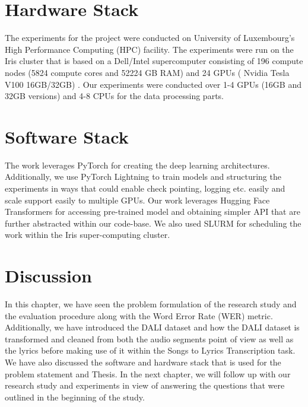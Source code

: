 \section{Hardware Stack}%
\label{sec:hpc}
The experiments for the project were conducted on University of Luxembourg's High Performance Computing (HPC) facility. The experiments were run on the Iris cluster that is based on a Dell/Intel supercomputer consisting of 196 compute nodes (5824 compute cores and 52224 GB RAM) and 24 GPUs ( Nvidia Tesla V100 16GB/32GB) \cite{VBCG_HPCS14}. Our experiments were conducted over 1-4 GPUs (16GB and 32GB versions) and 4-8 CPUs for the data processing parts.

\section{Software Stack}%
\label{sec:softwarestack}

The work leverages PyTorch \cite{paszke2019pytorch} for creating the deep learning architectures. Additionally, we use PyTorch Lightning\cite{Falcon_PyTorch_Lightning_2019} to train models and structuring the experiments in ways that could enable check pointing, logging etc. easily and scale support easily to multiple GPUs. Our work leverages Hugging Face Transformers \cite{wolf-etal-2020-transformers} for accessing pre-trained model and obtaining simpler API that are further abstracted within our code-base. We also used SLURM \cite{yoo2003slurm} for scheduling the work within the Iris super-computing cluster.


\section{Discussion}

In this chapter, we have seen the problem formulation of the research study and the evaluation procedure along with the Word Error Rate (WER) metric. Additionally, we have introduced the DALI dataset and how the DALI dataset is transformed and cleaned from both the audio segments point of view as well as the lyrics before making use of it within the Songs to Lyrics Transcription task. We have also discussed the software and hardware stack that is used for the problem statement and Thesis. In the next chapter, we will follow up with our research study and experiments in view of answering the questions that were outlined in the beginning of the study.